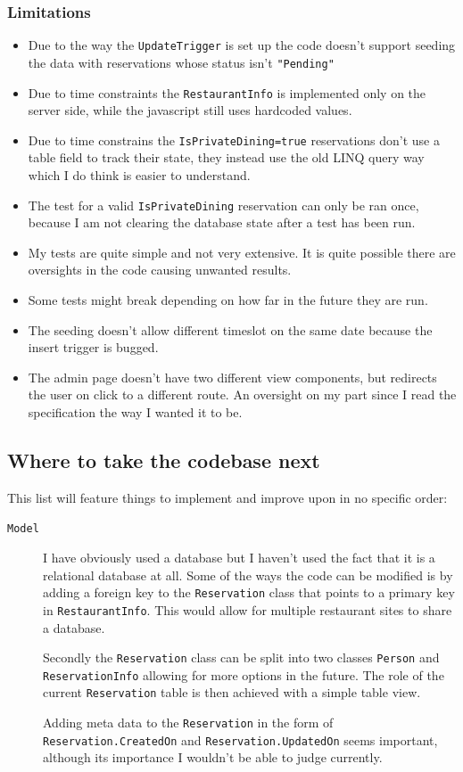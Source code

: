\documentclass[12pt, a4paper]{article}
\begin{document}
\subsubsection{Limitations}
\begin{itemize}
        \item Due to the way the \texttt{UpdateTrigger} is set up the code doesn't support seeding the data with reservations whose status isn't \texttt{"Pending"}
        \item Due to time constraints the \texttt{RestaurantInfo} is implemented only on the server side, while the javascript still uses hardcoded values.
        \item Due to time constrains the \texttt{IsPrivateDining=true} reservations don't use a table field to track their state, they instead use the old LINQ query way which I do think is easier to understand.
        \item The test for a valid \texttt{IsPrivateDining} reservation can only be ran once, because I am not clearing the database state after a test has been run.
        \item My tests are quite simple and not very extensive. It is quite possible there are oversights in the code causing unwanted results.
        \item Some tests might break depending on how far in the future they are run.
        \item The seeding doesn't allow different timeslot on the same date because the insert trigger is bugged.
        \item The admin page doesn't have two different view components, but redirects the user on click to a different route. An oversight on my part since I read the specification the way I wanted it to be.
\end{itemize}
\subsection{Where to take the codebase next}
This list will feature things to implement and improve upon in no specific order:
\begin{description}
    \item[\texttt{Model}] I have obviously used a database but I haven't used the fact that it is a relational database at all. Some of the ways the code can be modified is by adding a foreign key to the \texttt{Reservation} class that points to a primary key in \texttt{RestaurantInfo}. This would allow for multiple restaurant sites to share a database. 
    
    Secondly the \texttt{Reservation} class can be split into two classes \texttt{Person} and \texttt{ReservationInfo} allowing for more options in the future. The role of the current \texttt{Reservation} table is then achieved with a simple table view.
    
    Adding meta data to the \texttt{Reservation} in the form of \texttt{Reservation.CreatedOn} and \texttt{Reservation.UpdatedOn} seems important, although its importance I wouldn't be able to judge currently. 

\end{description}
\end{document}
